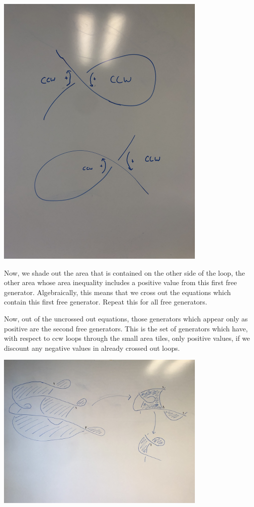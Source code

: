 \documentclass[11pt]{amsart}
\begin{document}
\includegraphics[width=4in,angle=-90]{Exterior Loops.JPG}


Now, we shade out the area that is contained on the other side of the loop, the other area whose area inequality includes a positive value from this first free generator. Algebraically, this means that we cross out the equations which contain this first free generator. Repeat this for all free generators.

Now, out of the uncrossed out equations, those generators which appear only as positive are the second free generators. This is the set of generators which have, with respect to ccw loops through the small area tiles, only positive values, if we discount any negative values in already crossed out loops. 

\includegraphics[width=4in]{Visualization of Algorithm.JPG}
\end{document}
